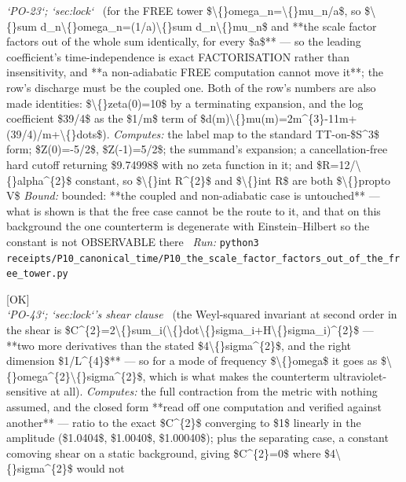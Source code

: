 \begin{description}
\textit{`PO-23`; `sec:lock`} \ (for the FREE tower \$\textbackslash\{\}omega\_n=\textbackslash\{\}mu\_n/a\$, so \$\textbackslash\{\}sum d\_n\textbackslash\{\}omega\_n=(1/a)\textbackslash\{\}sum d\_n\textbackslash\{\}mu\_n\$ and **the scale factor factors out of the whole sum identically, for every \$a\$** --- so the leading coefficient's time-independence is exact FACTORISATION rather than insensitivity, and **a non-adiabatic FREE computation cannot move it**; the row's discharge must be the coupled one. Both of the row's numbers are also made identities: \$\textbackslash\{\}zeta(0)=10\$ by a terminating expansion, and the log coefficient \$39/4\$ as the \$1/m\$ term of \$d(m)\textbackslash\{\}mu(m)=2m\textasciicircum{}\{3\}-11m+(39/4)/m+\textbackslash\{\}dots\$). 
\emph{Computes:} the label map to the standard TT-on-\$S\textasciicircum{}3\$ form; \$Z(0)=-5/2\$, \$Z(-1)=5/2\$; the summand's expansion; a cancellation-free hard cutoff returning \$9.74998\$ with no zeta function in it; and \$R=12/\textbackslash\{\}alpha\textasciicircum{}\{2\}\$ constant, so \$\textbackslash\{\}int R\textasciicircum{}\{2\}\$ and \$\textbackslash\{\}int R\$ are both \$\textbackslash\{\}propto V\$
 \emph{Bound:} bounded: **the coupled and non-adiabatic case is untouched** --- what is shown is that the free case cannot be the route to it, and that on this background the one counterterm is degenerate with Einstein--Hilbert so the constant is not OBSERVABLE there
\ \emph{Run:} \texttt{python3 receipts/P10\_canonical\_time/P10\_the\_scale\_factor\_factors\_out\_of\_the\_free\_tower.py}
\item[\rcptlabel{P10_the_weyl_invariant_at_second_order_carries_two_more_derivatives}{P10R4}\textbf{P10R4}\quad\texttt{P10\_the\_weyl\_invariant\_at\_second\_order\_carries\_two\_more\_derivatives}]\hfill\textsf{[OK]}\\
\textit{`PO-43`; `sec:lock`'s shear clause} \ (the Weyl-squared invariant at second order in the shear is \$C\textasciicircum{}\{2\}=2\textbackslash\{\}sum\_i(\textbackslash\{\}dot\textbackslash\{\}sigma\_i+H\textbackslash\{\}sigma\_i)\textasciicircum{}\{2\}\$ --- **two more derivatives than the stated \$4\textbackslash\{\}sigma\textasciicircum{}\{2\}\$, and the right dimension \$1/L\textasciicircum{}\{4\}\$** --- so for a mode of frequency \$\textbackslash\{\}omega\$ it goes as \$\textbackslash\{\}omega\textasciicircum{}\{2\}\textbackslash\{\}sigma\textasciicircum{}\{2\}\$, which is what makes the counterterm ultraviolet-sensitive at all). 
\emph{Computes:} the full contraction from the metric with nothing assumed, and the closed form **read off one computation and verified against another** --- ratio to the exact \$C\textasciicircum{}\{2\}\$ converging to \$1\$ linearly in the amplitude (\$1.0404\$, \$1.0040\$, \$1.00040\$); plus the separating case, a constant comoving shear on a static background, giving \$C\textasciicircum{}\{2\}=0\$ where \$4\textbackslash\{\}sigma\textasciicircum{}\{2\}\$ would not

\end{description}
